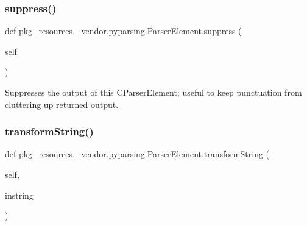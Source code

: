 \subsubsection{\texorpdfstring{suppress()}{suppress()}}
{\footnotesize\ttfamily def pkg\+\_\+resources.\+\_\+vendor.\+pyparsing.\+Parser\+Element.\+suppress (\begin{DoxyParamCaption}\item[{}]{self }\end{DoxyParamCaption})}

\begin{DoxyVerb}Suppresses the output of this C{ParserElement}; useful to keep punctuation from
cluttering up returned output.
\end{DoxyVerb}
 \mbox{\label{classpkg__resources_1_1__vendor_1_1pyparsing_1_1ParserElement_af9259df34d2c525d5dc935fe4082d40c}} 
\subsubsection{\texorpdfstring{transform\+String()}{transformString()}}
{\footnotesize\ttfamily def pkg\+\_\+resources.\+\_\+vendor.\+pyparsing.\+Parser\+Element.\+transform\+String (\begin{DoxyParamCaption}\item[{}]{self,  }\item[{}]{instring }\end{DoxyParamCaption})}

